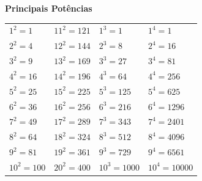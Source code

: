 \documentclass[12pt]{article}
\begin{document}
\begin{center}
\textbf{\Large Principais Potências}
\vspace{0.5cm}

\setlength{\tabcolsep}{25pt}

\begin{tabular}{llll}
$1^2=1$&$11^2=121$&$1^3=1$&$1^4=1$\\
$2^2=4$&$12^2=144$&$2^3=8$&$2^4=16$\\
$3^2=9$&$13^2=169$&$3^3=27$&$3^4=81$\\
$4^2=16$&$14^2=196$&$4^3=64$&$4^4=256$\\
$5^2=25$&$15^2=225$&$5^3=125$&$5^4=625$\\
$6^2=36$&$16^2=256$&$6^3=216$&$6^4=1296$\\
$7^2=49$&$17^2=289$&$7^3=343$&$7^4=2401$\\
$8^2=64$&$18^2=324$&$8^3=512$&$8^4=4096$\\
$9^2=81$&$19^2=361$&$9^3=729$&$9^4=6561$\\
$10^2=100$&$20^2=400$&$10^3=1000$&$10^4=10000$\\

\end{tabular}

\end{center}


\end{document}
